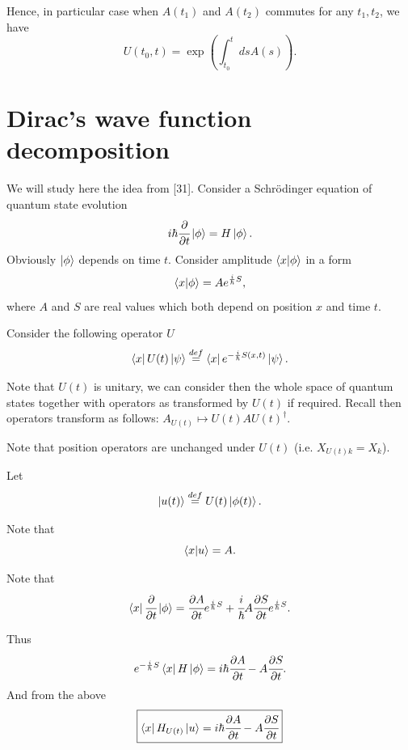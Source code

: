 \documentclass[main.tex]{subfiles}
\begin{document}
Hence, in particular case when $A(t_1)$ and $A(t_2)$ commutes for any $t_1, t_2$, we have
\begin{equation}
U(t_0, t) = \exp(\int_{t_0}^t ds A(s)).
\end{equation}

\section{Dirac's wave function decomposition}
We will study here the idea from  \cite{dirac1981}[31].
Consider a Schrödinger equation of quantum state evolution
\begin{equation}
i\hbar\cfrac{\partial}{\partial t} \ket{\phi} = H\ket{\phi}.
\end{equation}
Obviously $\ket{\phi}$ depends on time $t$. Consider amplitude $\bra{x}\ket{\phi}$ in a form 
\begin{equation}
\bra{x}\ket{\phi} = A e^{\frac{i}{\hbar}S},
\end{equation}
where $A$ and $S$ are real values which both depend on position $x$ and time $t$.

Consider the following operator $U$
\begin{equation}
\bra{x}U(t)\ket{\psi} \stackrel{def}{=} \bra{x} e^{-\frac{i}{\hbar}S(x,t)} \ket{\psi}.
\end{equation}

Note that $U(t)$ is unitary, we can consider then the whole space of quantum states together with operators as transformed by $U(t)$ if required. Recall then operators transform as follows: $A_{U(t)}\mapsto U(t) A U(t)^\dagger$.

Note that position operators are unchanged under $U(t)$ (i.e. $X_{U(t)k} = X_k$).

Let 
\begin{equation}
\ket{u(t)}  \stackrel{def}{=} U(t)\ket{\phi(t)}.
\end{equation}

Note that
\begin{equation}
\bra{x}\ket{u} = A.
\end{equation}

Note that 
\begin{equation}
\bra{x} \cfrac{\partial}{\partial t} \ket{\phi} = \cfrac{\partial A}{\partial t} e^{\frac{i}{\hbar}S} + \cfrac{i}{\hbar} A\cfrac{\partial S}{\partial t}e^{\frac{i}{\hbar}S}.
\end{equation}

Thus 
\begin{equation}
e^{-\frac{i}{\hbar}S} \bra{x} H \ket{\phi} = i\hbar \cfrac{\partial A}{\partial t} - A \cfrac{\partial S}{\partial t}. 
\end{equation}
And from the above
\begin{equation}
\boxed{
\bra{x} H_{U(t)} \ket{u} = i\hbar \cfrac{\partial A}{\partial t} - A \cfrac{\partial S}{\partial t}}
\end{equation}
\end{document}
